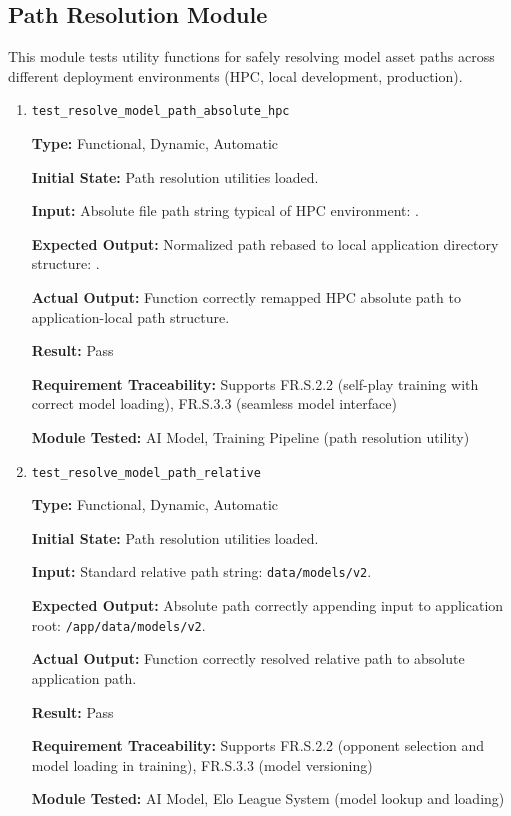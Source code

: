 \documentclass[12pt, titlepage]{article}
\begin{document}
\subsection{Path Resolution Module}

This module tests utility functions for safely resolving model asset paths across different deployment environments (HPC, local development, production).

\begin{enumerate}

\item \texttt{test\_resolve\_model\_path\_absolute\_hpc}

\textbf{Type:} Functional, Dynamic, Automatic

\textbf{Initial State:} Path resolution utilities loaded.

\textbf{Input:} Absolute file path string typical of HPC environment: .

\textbf{Expected Output:} Normalized path rebased to local application directory structure: .

\textbf{Actual Output:} Function correctly remapped HPC absolute path to application-local path structure.

\textbf{Result:} Pass

\textbf{Requirement Traceability:} Supports FR.S.2.2 (self-play training with correct model loading), FR.S.3.3 (seamless model interface)

\textbf{Module Tested:} AI Model, Training Pipeline (path resolution utility)


\item \texttt{test\_resolve\_model\_path\_relative}

\textbf{Type:} Functional, Dynamic, Automatic

\textbf{Initial State:} Path resolution utilities loaded.

\textbf{Input:} Standard relative path string: \texttt{data/models/v2}.

\textbf{Expected Output:} Absolute path correctly appending input to application root: \texttt{/app/data/models/v2}.

\textbf{Actual Output:} Function correctly resolved relative path to absolute application path.

\textbf{Result:} Pass

\textbf{Requirement Traceability:} Supports FR.S.2.2 (opponent selection and model loading in training), FR.S.3.3 (model versioning)

\textbf{Module Tested:} AI Model, Elo League System (model lookup and loading)

\end{enumerate}
\end{document}

